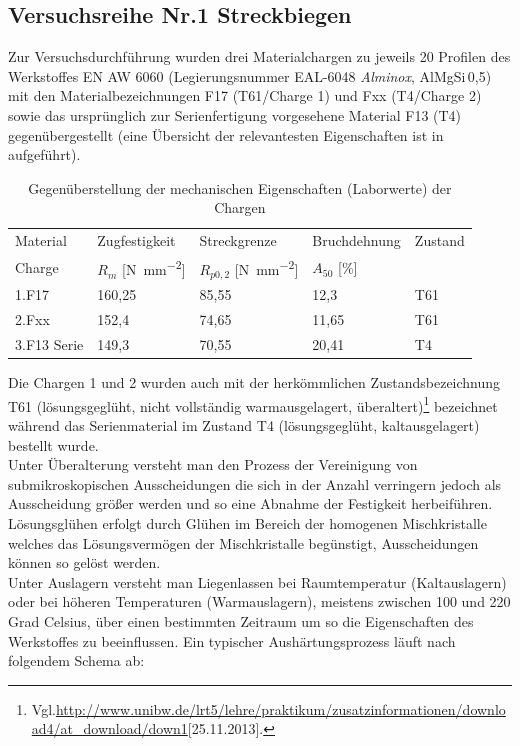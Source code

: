 \documentclass[12pt,a4paper,parskip,twoside,BCOR5mm,headsepline]{scrartcl}
\begin{document}
\subsection{Versuchsreihe Nr.1 Streckbiegen}
\label{sec:versuchsreihe1}
Zur Versuchsdurchführung wurden drei Materialchargen zu jeweils 20 Profilen des Werkstoffes EN AW 6060 (Legierungsnummer EAL-6048 \emph{Alminox}, AlMgSi\,0,5) mit den Materialbezeichnungen F17 (T61/Charge 1) und Fxx (T4/Charge 2) sowie das ursprünglich zur Serienfertigung vorgesehene Material F13 (T4)  gegenübergestellt (eine Übersicht der relevantesten Eigenschaften ist in  aufgeführt).
\begin{table}[hbtp]
\caption{Gegenüberstellung der mechanischen Eigenschaften (Laborwerte) der Chargen}
\label{tab:chargeneigenschaften}
\centering
\begin{tabular}{lllll}
\toprule
Material & Zugfestigkeit & Streckgrenze & Bruchdehnung & Zustand \\
Charge &  $R_m $ [\si{\newton\per\milli\meter\squared}] &  $R_{p0,2}$ [\si{\newton\per\milli\meter\squared}] &  $A_{50}$ [\%] & \\
\midrule
1.F17 & 160,25 & 85,55 &  12,3  & T61 \\
2.Fxx & 152,4 & 74,65 &   11,65  & T61 \\
3.F13 Serie & 149,3 & 70,55 & 20,41  & T4 \\
\bottomrule




\end{tabular}
\end{table}



 Die Chargen 1 und 2 wurden auch mit der herkömmlichen Zustandsbezeichnung T61 (lösungsgeglüht, nicht vollständig warmausgelagert, überaltert)\footnote{Vgl.\url{http://www.unibw.de/lrt5/lehre/praktikum/zusatzinformationen/download4/at_download/down1}[25.11.2013].} bezeichnet während das Serienmaterial im Zustand T4 (lösungsgeglüht, kaltausgelagert) bestellt wurde. \\
 Unter Überalterung versteht man  den Prozess der Vereinigung von  submikroskopischen Ausscheidungen die sich  in der Anzahl verringern jedoch als Ausscheidung größer werden und so eine Abnahme der Festigkeit herbeiführen.\autocite[52]{wki}\\
  Lösungsglühen erfolgt durch Glühen im Bereich der homogenen Mischkristalle welches das   Lösungsvermögen der Mischkristalle begünstigt, Ausscheidungen können so gelöst werden.\\
   Unter Auslagern versteht man Liegenlassen bei Raumtemperatur (Kaltauslagern) oder bei  höheren Temperaturen (Warmauslagern), meistens zwischen 100 und 220 Grad Celsius, über einen bestimmten Zeitraum um so die Eigenschaften des Werkstoffes zu beeinflussen.\autocite[213]{wk}
Ein typischer Aushärtungsprozess läuft nach folgendem Schema ab:
\end{document}
